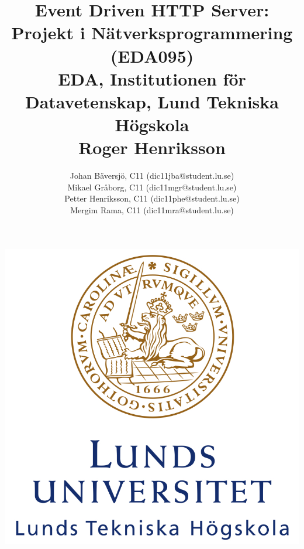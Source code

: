 \documentclass[a4paper]{article}%
\title{
	Event Driven HTTP Server:\\
	Projekt i Nätverksprogrammering (EDA095)\\
	EDA, Institutionen för Datavetenskap, Lund Tekniska Högskola\\
	Roger Henriksson}
\author{
Johan Bäversjö, C11 (dic11jba@student.lu.se)\\
Mikael Gråborg, C11 (dic11mgr@student.lu.se)\\
Petter Henriksson, C11 (dic11phe@student.lu.se)\\
Mergim Rama, C11 (dic11mra@student.lu.se)\\
}
\begin{document}

\maketitle
\centerline{\includegraphics[scale = 0.6]{LTH.jpg}}
\thispagestyle{empty}

\newpage
\setcounter{page}{1}


\tableofcontents
\newpage










\end{document}
